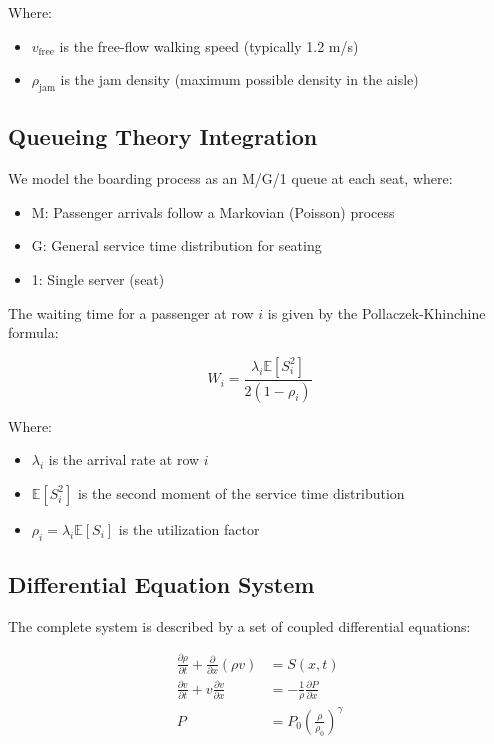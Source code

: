 \documentclass[a4paper,12pt]{article}
\begin{document}
Where:
\begin{itemize}
    \item $v_{\text{free}}$ is the free-flow walking speed (typically 1.2 m/s)
    \item $\rho_{\text{jam}}$ is the jam density (maximum possible density in the aisle)
\end{itemize}

\subsection{Queueing Theory Integration}

We model the boarding process as an M/G/1 queue at each seat, where:
\begin{itemize}
    \item M: Passenger arrivals follow a Markovian (Poisson) process
    \item G: General service time distribution for seating
    \item 1: Single server (seat)
\end{itemize}

The waiting time for a passenger at row $i$ is given by the Pollaczek-Khinchine formula:

\begin{equation}
W_i = \frac{\lambda_i \mathbb{E}[S_i^2]}{2(1-\rho_i)}
\end{equation}

Where:
\begin{itemize}
    \item $\lambda_i$ is the arrival rate at row $i$
    \item $\mathbb{E}[S_i^2]$ is the second moment of the service time distribution
    \item $\rho_i = \lambda_i \mathbb{E}[S_i]$ is the utilization factor
\end{itemize}

\subsection{Differential Equation System}

The complete system is described by a set of coupled differential equations:

\begin{align}
\frac{\partial \rho}{\partial t} + \frac{\partial}{\partial x}(\rho v) &= S(x,t) \\
\frac{\partial v}{\partial t} + v\frac{\partial v}{\partial x} &= -\frac{1}{\rho}\frac{\partial P}{\partial x} \\
P &= P_0 \left(\frac{\rho}{\rho_0}\right)^\gamma
\end{align}
\end{document}

